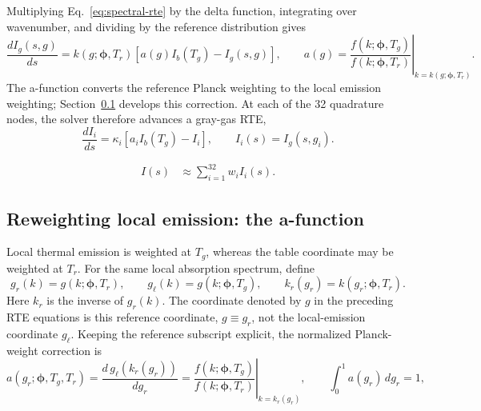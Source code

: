 \documentclass[11pt,letterpaper]{article}
\begin{document}
Multiplying Eq.~\eqref{eq:spectral-rte} by the delta function, integrating
over wavenumber, and dividing by the reference distribution gives
\begin{equation}
\frac{d I_g(s,g)}{ds}
=k(g;\boldsymbol{\phi},T_r)
\left[a(g)I_b(T_g)-I_g(s,g)\right],
\qquad
 a(g)=\left.\frac{f(k;\boldsymbol{\phi},T_g)}
 {f(k;\boldsymbol{\phi},T_r)}\right|_{k=k(g;\boldsymbol{\phi},T_r)}.
\label{eq:g-rte}
\end{equation}
The a-function converts the reference Planck weighting to the local emission
weighting; Section~\ref{sec:fsck-a} develops this correction. At each of the 32 quadrature
nodes, the solver therefore advances a gray-gas RTE,
\begin{equation}
\frac{d I_i}{ds}=\kappa_i\left[a_i I_b(T_g)-I_i\right],
\qquad I_i(s)=I_g(s,g_i).
\label{eq:quadrature-rte}
\end{equation}

\begin{align}
I(s)&\approx\sum_{i=1}^{32}w_i I_i(s).
\label{eq:fsck-integral}
\end{align}


\subsection{Reweighting local emission: the a-function}
\label{sec:fsck-a}
Local thermal emission is weighted at $T_g$, whereas the table coordinate
may be weighted at $T_r$. For the same local absorption spectrum, define
\[
g_r(k)=g(k;\boldsymbol{\phi},T_r),\qquad
 g_\ell(k)=g(k;\boldsymbol{\phi},T_g),\qquad
 k_r(g_r)=k(g_r;\boldsymbol{\phi},T_r).
\]
Here $k_r$ is the inverse of $g_r(k)$. The coordinate denoted by $g$ in
the preceding RTE equations is this reference coordinate, $g\equiv g_r$,
not the local-emission coordinate $g_\ell$. Keeping the reference subscript
explicit, the normalized Planck-weight correction is
\begin{equation}
a(g_r;\boldsymbol{\phi},T_g,T_r)
=\frac{d\,g_\ell(k_r(g_r))}{dg_r}
=\left.\frac{f(k;\boldsymbol{\phi},T_g)}
{f(k;\boldsymbol{\phi},T_r)}\right|_{k=k_r(g_r)},
\qquad \int_0^1 a(g_r)\,dg_r=1,
\label{eq:fsck-a}
\end{equation}
\end{document}
